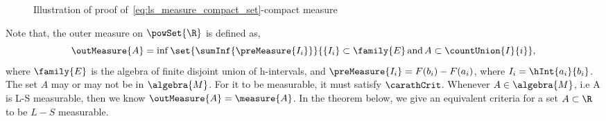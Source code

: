 \begin{figure}
    
    \caption{Illustration of proof of~\ref{eq:ls_measure_compact_set}-compact
	measure}\label{fig:tikz:ls_compact}
\end{figure}
Note that, the outer measure on $\powSet{\R}$ is defined as,
\[\outMeasure{A} = \inf\set{\sumInf{\preMeasure{I_i}}}{\lbrace I_i \rbrace \subset
	\family{E}\,\text{and}\,A\subset\countUnion{I}{i}},\]
where $\family{E}$ is the algebra of finite disjoint union of h-intervals, and $\preMeasure{I_i} =
F(b_i) - F(a_i)$, where $I_i = \hInt{a_i}{b_i}$. The set $A$ may or may 
not be in $\algebra{M}$. For it to be measurable, it must satisfy $\carathCrit$. 
Whenever $A \in \algebra{M}$, i.e A is L-S measurable, then we know $\outMeasure{A} = \measure{A}$.
In the theorem below, we give an equivalent criteria for a set $A\subset \R$ to be $L-S$ measurable.


